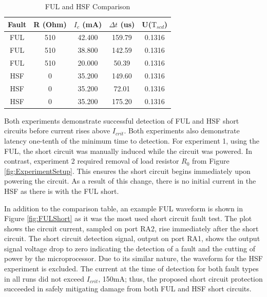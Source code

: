 \begin{table}
    \centering
    \bgroup
    \def\arraystretch{1.25}%
    \begin{tabular}{| c | c | c | c | c |}
            \hline			
            Fault & R (Ohm) & $I_{c}$ (mA) & $\Delta t$ (us) & U($\mathrm{T}_{scd}$)\\ \hline \hline \cline{1-5}
        FUL & 510 & 42.400 & 159.79 & 0.1316\\ \hline
        FUL & 510 & 38.800 & 142.59 & 0.1316\\	\hline
        FUL & 510 & 20.000 &  50.39 & 0.1316\\	\hline
        HSF &   0 & 35.200 & 149.60 & 0.1316\\	\hline
        HSF &   0 & 35.200 &  72.01 & 0.1316\\	\hline
        HSF &   0 & 35.200 & 175.20 & 0.1316\\	\hline
        \end{tabular}
    \egroup
    \caption{FUL and HSF Comparison}
    \label{tab:FULHSFComparison}
\end{table}

Both experiments demonstrate successful detection of FUL and HSF short circuits before current rises above $I_{crit}$.
Both experiments also demonstrate latency one-tenth of the minimum time to detection.
For experiment 1, using the FUL, the short circuit was manually induced while the circuit was powered.
In contrast, experiment 2 required removal of load resistor $R_{0}$ from Figure \ref{fig:ExperimentSetup}.
This ensures the short circuit begins immediately upon powering the circuit.
As a result of this change, there is no initial current in the HSF as there is with the FUL short.

In addition to the comparison table, an example FUL waveform is shown in Figure \ref{fig:FULShort} as it was the most used short circuit fault test.
The plot shows the circuit current, sampled on port RA2, rise immediately after the short circuit.
The short circuit detection signal, output on port RA1, shows the output signal voltage drop to zero indicating the detection of a fault and the cutting of power by the microprocessor.
Due to its similar nature, the waveform for the HSF experiment is excluded.
The current at the time of detection for both fault types in all runs did not exceed $I_{crit}$, 150mA; thus, the proposed short circuit protection succeeded in safely mitigating damage from both FUL and HSF short circuits.

